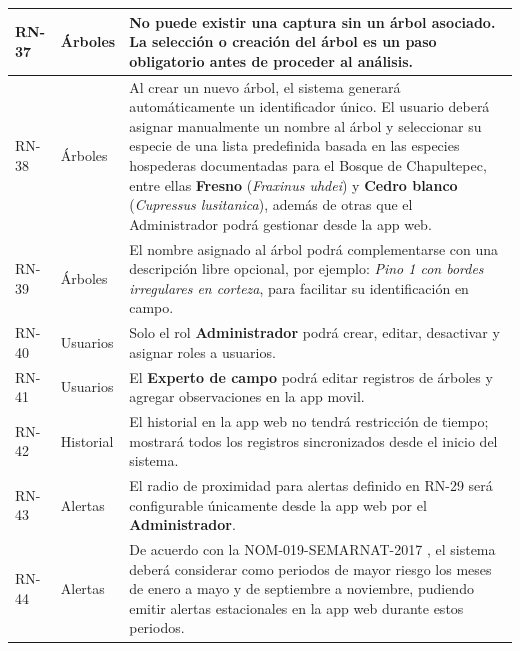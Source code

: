 \begin{longtable}{|>{\centering\arraybackslash}m{1.8cm}|>{\centering\arraybackslash}m{2.5cm}|m{9.5cm}|}
RN-37 & Árboles & No puede existir una captura sin un árbol asociado. La selección o creación del árbol es un paso obligatorio antes de proceder al análisis. \\
\hline
RN-38 & Árboles & Al crear un nuevo árbol, el sistema generará automáticamente un identificador único. El usuario deberá asignar manualmente un nombre al árbol y seleccionar su especie de una lista predefinida basada en las especies hospederas documentadas para el Bosque de Chapultepec, entre ellas \textbf{Fresno} (\textit{Fraxinus uhdei}) y \textbf{Cedro blanco} (\textit{Cupressus lusitanica}), además de otras que el Administrador podrá gestionar desde la app web. \\
\hline
RN-39 & Árboles & El nombre asignado al árbol podrá complementarse con una descripción libre opcional, por ejemplo: \textit{Pino 1 con bordes irregulares en corteza}, para facilitar su identificación en campo. \\
\hline
RN-40 & Usuarios & Solo el rol \textbf{Administrador} podrá crear, editar, desactivar y asignar roles a usuarios. \\
\hline
RN-41 & Usuarios & El \textbf{Experto de campo} podrá editar registros de árboles y agregar observaciones en la app movil. \\
\hline
RN-42 & Historial & El historial en la app web no tendrá restricción de tiempo; mostrará todos los registros sincronizados desde el inicio del sistema. \\
\hline









RN-43 & Alertas & El radio de proximidad para alertas definido en RN-29 será configurable únicamente desde la app web por el \textbf{Administrador}. \\
\hline










RN-44 & Alertas & De acuerdo con la NOM-019-SEMARNAT-2017 \cite{nom019_semarnat_2017}, el sistema deberá considerar como periodos de mayor riesgo los meses de enero a mayo y de septiembre a noviembre, pudiendo emitir alertas estacionales en la app web durante estos periodos. \\
\hline











\end{longtable}
